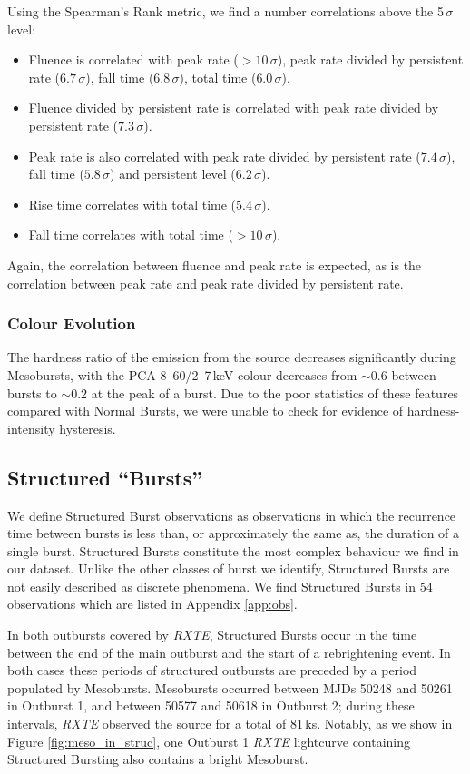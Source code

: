 \par Using the Spearman's Rank metric, we find a number correlations above the 5$\,\sigma$ level:
\begin{itemize}
\item Fluence is correlated with peak rate ($>10\,\sigma$), peak rate divided by persistent rate ($6.7\,\sigma$), fall time ($6.8\,\sigma$), total time ($6.0\,\sigma$).
\item Fluence divided by persistent rate is correlated with peak rate divided by persistent rate ($7.3\,\sigma$).
\item Peak rate is also correlated with peak rate divided by persistent rate ($7.4\,\sigma$), fall time ($5.8\,\sigma$) and persistent level ($6.2\,\sigma$).
\item Rise time correlates with total time ($5.4\,\sigma$).
\item Fall time correlates with total time ($>10\,\sigma$).
\end{itemize}

Again, the correlation between fluence and peak rate is expected, as is the correlation between peak rate and peak rate divided by persistent rate.

\subsubsection{Colour Evolution}

\par The hardness ratio of the emission from the source decreases significantly during Mesobursts, with the PCA 8--60/2--7\,keV colour decreases from $\sim0.6$ between bursts to $\sim0.2$ at the peak of a burst.  Due to the poor statistics of these features compared with Normal Bursts, we were unable to check for evidence of hardness-intensity hysteresis.

\subsection{Structured ``Bursts''}

\par We define Structured Burst observations as observations in which the recurrence time between bursts is less than, or approximately the same as, the duration of a single burst.  Structured Bursts constitute the most complex behaviour we find in our dataset.  Unlike the other classes of burst we identify, Structured Bursts are not easily described as discrete phenomena.  We find Structured Bursts in 54 observations which are listed in Appendix \ref{app:obs}.
\par In both outbursts covered by \textit{RXTE}, Structured Bursts occur in the time between the end of the main outburst and the start of a rebrightening event.  In both cases these periods of structured outbursts are preceded by a period populated by Mesobursts.  Mesobursts occurred between MJDs 50248 and 50261 in Outburst 1, and between 50577 and 50618 in Outburst 2; during these intervals, \textit{RXTE} observed the source for a total of 81\,ks.  Notably, as we show in Figure \ref{fig:meso_in_struc}, one Outburst 1 \textit{RXTE} lightcurve containing Structured Bursting also contains a bright Mesoburst.

